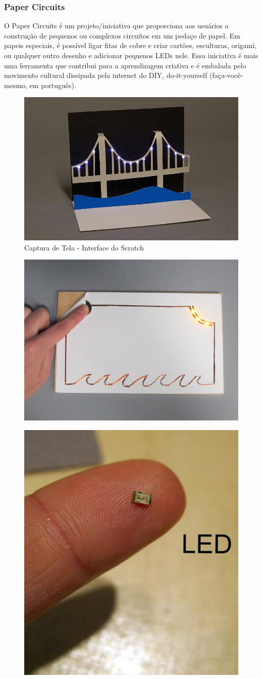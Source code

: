 \subsubsection{Paper Circuits}

O Paper Circuits é um projeto/iniciativa que proporciona aos usuários a construção de pequenos ou complexos circuitos em um pedaço de papel. Em papeis especiais, é possível ligar fitas de cobre e criar cartões, esculturas, origami, ou qualquer outro desenho e adicionar pequenos LEDs nele.
Essa iniciativa é mais uma ferramenta que contribui para a aprendizagem criativa e é embalada pelo movimento cultural dissipada pela internet do DIY, do-it-yourself (faça-você-mesmo, em português).

\begin{figure}[ht]
\centering
\includegraphics[width=.5\textwidth]{edit/img/circuitpaper.jpg}
\caption{Captura de Tela - Interface do Scratch}
\label{fig:exampleFig1}
\end{figure}

\begin{figure}[ht]
\centering
\includegraphics[width=.5\textwidth]{edit/img/circuitpaper2.jpg}
\caption{}
\label{fig:exampleFig1}
\end{figure}

\begin{figure}[ht]
\centering
\includegraphics[width=.5\textwidth]{edit/img/circuitpaper3.jpg}
\caption{}
\label{fig:exampleFig1}
\end{figure}

